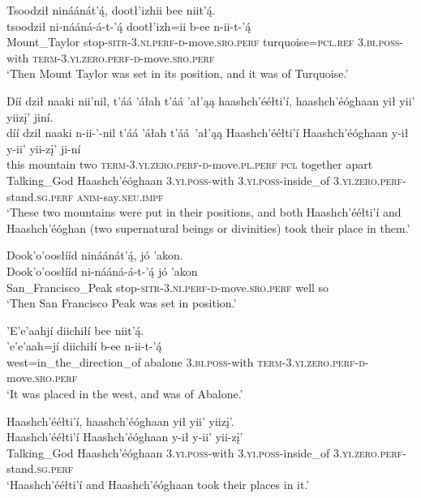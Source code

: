 \ea\label{ex:text4-9-5}
Tsoodził nináánát’ą́, dootł’izhii bee niit’ą́.\\
\gll tsoodził	ni-nááná-á-t-’ą́	dootł’izh=ii	b-ee	n-ii-t-’ą́\\
     Mount\_Taylor	stop-\textsc{sitr}-3.\textsc{ni}.\textsc{perf}-\textsc{d}-move.\textsc{sro}.\textsc{perf}	turquoise=\textsc{pcl}.\textsc{ref}	3.\textsc{bi}.\textsc{poss}-with	\textsc{term}-3.\textsc{yi}.\textsc{zero}.\textsc{perf}-\textsc{d}-move.\textsc{sro}.\textsc{perf}\\
\glt `Then Mount Taylor was set in its position, and it was of Turquoise.'
\z

\ea\label{ex:text4-9-6}
Díí dził naaki nii’nil, t’áá ’áłah t’áá ’ał’ąą haashch’ééłti’í, haashch’éóghaan yił yii’ yiizį’ jiní.\\
\gll díí	dził	naaki	n-ii-’-nil	t’áá	’áłah	t’áá~{’ał’ąą}	Haashch’ééłti’í	Haashch’éóghaan	y-ił	y-ii’	yii-zį’	ji-ní\\
     this	mountain	two	\textsc{term}-3.\textsc{yi}.\textsc{zero}.\textsc{perf}-\textsc{d}-move.\textsc{pl}.\textsc{perf}	\textsc{pcl}	together	apart	Talking\_God	Haashch’éóghaan	3.\textsc{yi}.\textsc{poss}-with	3.\textsc{yi}.\textsc{poss}-inside\_of	3.\textsc{yi}.\textsc{zero}.\textsc{perf}-stand.\textsc{sg}.\textsc{perf}	\textsc{anim}-say.\textsc{neu}.\textsc{impf}\\
\glt `These two mountains were put in their positions, and both Haashch'ééłti’í and Haashch'éóghan (two supernatural beings or divinities) took their place in them.'
\z

\ea\label{ex:text4-9-7}
Dook’o’oosłííd nináánát’ą́, jó ’akon.\\
\gll Dook’o’oosłííd	ni-nááná-á-t-’ą́	jó	’akon\\
     San\_Francisco\_Peak	stop-\textsc{sitr}-3.\textsc{ni}.\textsc{perf}-\textsc{d}-move.\textsc{sro}.\textsc{perf}	well	so\\
\glt `Then San Francisco Peak was set in position.'
\z

\ea\label{ex:text4-9-8}
’E’e’aahjí diichiłí bee niit’ą́.\\
\gll ’e’e’aah=jí	diichiłí	b-ee	n-ii-t-’ą́\\
     west=in\_the\_direction\_of	abalone	3.\textsc{bi}.\textsc{poss}-with	\textsc{term}-3.\textsc{yi}.\textsc{zero}.\textsc{perf}-\textsc{d}-move.\textsc{sro}.\textsc{perf}\\
\glt `It was placed in the west, and was of Abalone.'
\z

\ea\label{ex:text4-9-9}
Haashch’ééłti’í, haashch’éóghaan yił yii’ yiizį’.\\
\gll Haashch’ééłti’í	Haashch’éóghaan	y-ił	y-ii’	yii-zį’\\
     Talking\_God	Haashch’éóghaan	3.\textsc{yi}.\textsc{poss}-with	3.\textsc{yi}.\textsc{poss}-inside\_of	3.\textsc{yi}.\textsc{zero}.\textsc{perf}-stand.\textsc{sg}.\textsc{perf}\\
\glt `Haashch'ééłti'í and Haashch'éóghaan took their places in it.'
\z


